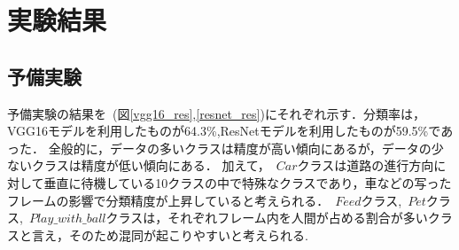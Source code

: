 \chapter{実験結果}
\section{予備実験}
予備実験の結果を~(図\ref{vgg16_res},\ref{resnet_res})にそれぞれ示す．分類率は，VGG16モデルを利用したものが64.3\%,ResNetモデルを利用したものが59.5\%であった．
全般的に，データの多いクラスは精度が高い傾向にあるが，データの少ないクラスは精度が低い傾向にある．
加えて，~\(Car\)クラスは道路の進行方向に対して垂直に待機している10クラスの中で特殊なクラスであり，車などの写ったフレームの影響で分類精度が上昇していると考えられる．~\(Feed\)クラス,~\(Pet\)クラス,~\(Play\_with\_ball\)クラスは，それぞれフレーム内を人間が占める割合が多いクラスと言え，そのため混同が起こりやすいと考えられる.



